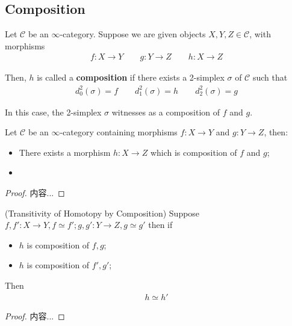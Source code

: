 \documentclass[Total.tex]{subfiles}
\begin{document}
			\subsection{Composition}
				\begin{Def}
					Let $\mathcal{C}$ be an $\infty$-category. Suppose we are given objects $X,Y,Z\in \mathcal{C}$, with morphisms
					\begin{gather*}
						f:X\rightarrow Y\qquad g:Y\rightarrow Z\qquad h:X\rightarrow Z
					\end{gather*}
					
					Then, $h$ is called a \textbf{composition} if there exists a 2-simplex $\sigma$ of $\mathcal{C}$ such that
					\begin{gather*}
						d^2_0(\sigma)=f\qquad d^2_1(\sigma)=h\qquad d^2_2(\sigma)=g
					\end{gather*}
					
					In this case, the 2-simplex $\sigma$ witnesses as a composition of $f$ and $g$.
				\end{Def}
				
				\begin{proposition}
					Let $\mathcal{C}$ be an $\infty$-category containing morphisms $f:X\rightarrow Y$ and $g:Y\rightarrow Z$, then:
					\begin{itemize}
						\item There exists a morphism $h:X\rightarrow Z$ which is composition of $f$ and $g$;
						
						\item 
					\end{itemize}
				\end{proposition}
				\begin{proof}
					内容...
				\end{proof}
				
				\begin{proposition}
					(Transitivity of Homotopy by Composition) Suppose $f,f':X\rightarrow Y,f\simeq f';g,g':Y\rightarrow Z,g\simeq g'$ then if
					\begin{itemize}
						\item $h$ is composition of $f,g$;
						\item $h$ is composition of $f',g'$;
					\end{itemize}
					
					Then
					\begin{gather*}
						h\simeq h'
					\end{gather*}
				\end{proposition}
				\begin{proof}
					内容...
				\end{proof}
\end{document}
